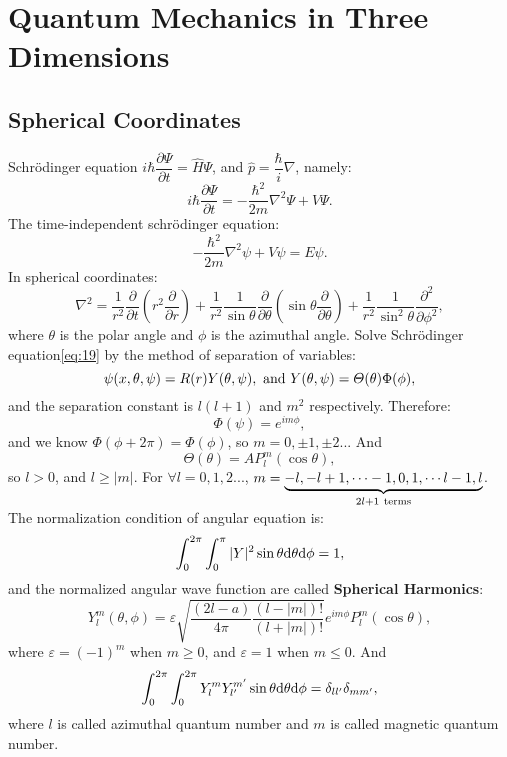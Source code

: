 \documentclass[12pt, 
]{article}
\begin{document}
\section{Quantum Mechanics in Three Dimensions}
\subsection{Spherical Coordinates}
Schr\"odinger equation $i\hbar\dfrac{\partial \varPsi}{\partial t}=\hat{H}\varPsi$, and $\hat{p}=\dfrac{\hbar}{i}\nabla$, namely:
\begin{equation}\label{eq:18}
	i\hbar\frac{\partial\varPsi}{\partial t}=-\frac{\hbar^2}{2m}\nabla^2\varPsi+V\varPsi.
\end{equation}
The time-independent schr\"odinger equation:
\begin{equation}\label{eq:19}
	-\frac{\hbar^2}{2m}\nabla^2\psi+V\psi=E\psi.
\end{equation}
In spherical coordinates:
\[
	\nabla^2=\frac{1}{r^2}\frac{\partial}{\partial t}\left(r^2\frac{\partial}{\partial r}\right)+\frac{1}{r^2}\frac{1}{\sin\theta}\frac{\partial}{\partial\theta}\left(\sin\theta\frac{\partial}{\partial\theta}\right)+\frac{1}{r^2}\frac{1}{\sin^2\theta}\frac{\partial^2}{\partial \phi^2},
\]
where $\theta$ is the polar angle and $\phi$ is the azimuthal angle. Solve Schrödinger equation\eqref{eq:19} by the method of separation of variables:
\[
	\psi(x,\theta,\psi)=R(r)Y(\theta,\psi),~{\rm and~}Y(\theta,\psi)=\varTheta(\theta)\Phi(\phi),
\]
and the separation constant is $l(l+1)$ and $m^2$ respectively. Therefore:
\[
	\Phi(\psi)=e^{im\phi},
\]
and we know $\Phi(\phi+2\pi)=\Phi(\phi)$, so $m=0,\pm1,\pm2...$
And \[
	\varTheta(\theta)=AP_l^m(\cos\theta),
\]
so $l>0$, and $l\geqslant|m|$. For $\forall l=0,1,2...$, $m=\underbrace{-l,-l+1,\cdots-1,0,1,\cdots l-1,l}_{2l+1~{\rm terms}}$.\\
The normalization condition of angular equation is:
\[
	\int_0^{2\pi}\int_0^{\pi}|Y|^2\sin\theta{\rm d}\theta{\rm d}\phi=1,
\]
and the normalized angular wave function are called {\bf Spherical Harmonics}:
\[
	Y_l^m(\theta,\phi)=\varepsilon\sqrt{\frac{(2l-a)}{4\pi}\frac{(l-|m|)!}{(l+|m|)!}}e^{im\phi}P_l^m(\cos\theta),
\]
where $\varepsilon=(-1)^m$ when $m\geqslant0$, and $\varepsilon=1$ when $m\leqslant0$. And
\[
	\int_0^{2\pi}\int_0^{2\pi}Y_l^mY_{l'}^{m'}\sin\theta{\rm d}\theta{\rm d}\phi=\delta_{ll'}\delta_{mm'},
\]
where $l$ is called azimuthal quantum number and $m$ is called magnetic quantum number.
\\
\end{document}
